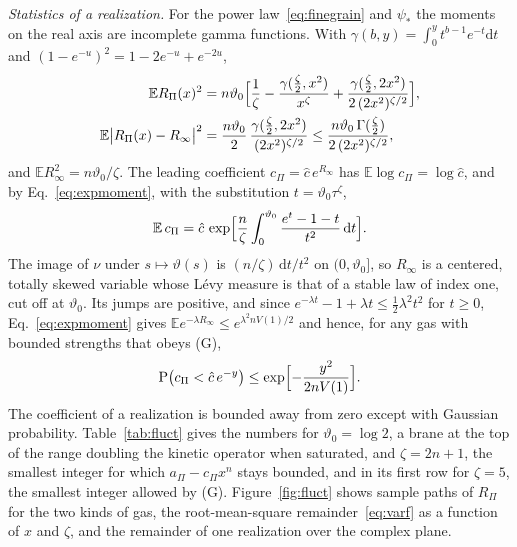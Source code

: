 \documentclass[a4paper,11pt]{article}
\newcommand{\bE}{\mathbb{E}}
\newcommand{\dd}{\mathrm{d}}
\begin{document}
\textit{Statistics of a realization.} For the power law~\eqref{eq:finegrain} and $\psi_*$ the moments on the real axis are incomplete gamma functions. With $\gamma(b,y)=\int_0^yt^{b-1}e^{-t}\dd t$ and $(1-e^{-u})^2=1-2e^{-u}+e^{-2u}$,
\begin{align}
\bE R_\Pi(x)^2&=n\vartheta_0\Bigl[\frac1\zeta-\frac{\gamma(\frac\zeta2,x^2)}{x^{\zeta}}+\frac{\gamma(\frac\zeta2,2x^2)}{2\,(2x^2)^{\zeta/2}}\Bigr],\label{eq:varR}\\
\bE\bigl|R_\Pi(x)-R_\infty\bigr|^2&=\frac{n\vartheta_0}{2}\,\frac{\gamma(\frac\zeta2,2x^2)}{(2x^2)^{\zeta/2}}\le\frac{n\vartheta_0\,\Gamma(\frac\zeta2)}{2\,(2x^2)^{\zeta/2}} ,\label{eq:varf}
\end{align}
and $\bE R_\infty^2=n\vartheta_0/\zeta$. The leading coefficient $c_\Pi=\hat c\,e^{R_\infty}$ has $\bE\log c_\Pi=\log\hat c$, and by Eq.~\eqref{eq:expmoment}, with the substitution $t=\vartheta_0\tau^\zeta$,
\begin{equation}
\label{eq:EeR}
\bE\,c_\Pi=\hat c\,\exp\Bigl[\frac n\zeta\int_0^{\vartheta_0}\frac{e^{t}-1-t}{t^2}\,\dd t\Bigr].
\end{equation}
The image of $\nu$ under $s\mapsto\vartheta(s)$ is $(n/\zeta)\,\dd t/t^2$ on $(0,\vartheta_0]$, so $R_\infty$ is a centered, totally skewed variable whose L\'evy measure is that of a stable law of index one, cut off at $\vartheta_0$. Its jumps are positive, and since $e^{-\lambda t}-1+\lambda t\le\frac12\lambda^2t^2$ for $t\ge0$, Eq.~\eqref{eq:expmoment} gives $\bE e^{-\lambda R_\infty}\le e^{\lambda^2nV(1)/2}$ and hence, for any gas with bounded strengths that obeys (G),
\begin{equation}
\label{eq:lowertail}
\mathrm P\bigl(c_\Pi<\hat c\,e^{-y}\bigr)\le\exp\Bigl[-\frac{y^2}{2nV(1)}\Bigr].
\end{equation}
The coefficient of a realization is bounded away from zero except with Gaussian probability. Table~\ref{tab:fluct} gives the numbers for $\vartheta_0=\log2$, a brane at the top of the range doubling the kinetic operator when saturated, and $\zeta=2n+1$, the smallest integer for which $a_\Pi-c_\Pi x^n$ stays bounded, and in its first row for $\zeta=5$, the smallest integer allowed by (G). Figure~\ref{fig:fluct} shows sample paths of $R_\Pi$ for the two kinds of gas, the root-mean-square remainder~\eqref{eq:varf} as a function of $x$ and $\zeta$, and the remainder of one realization over the complex plane.
\end{document}
